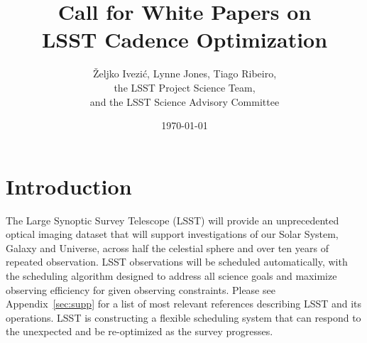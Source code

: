 \documentclass[DM,toc,usenatbib]{lsstdoc}
\title[Call for LSST Cadence White Papers]{Call for White Papers on \\ LSST Cadence Optimization}
\author{\v{Z}eljko Ivezi\'{c}, Lynne Jones, Tiago Ribeiro, \\
                 the LSST Project Science Team, \\
                 and  the LSST Science Advisory Committee}
\date{\today}
\begin{document}
\maketitle


\section{Introduction} 

The Large Synoptic Survey Telescope (LSST) will provide an unprecedented optical 
imaging dataset that will support investigations of our Solar System, Galaxy and Universe, 
across half the celestial sphere and over ten years of repeated observation. LSST observations will be
scheduled automatically, with the scheduling algorithm designed to address all science goals 
and maximize observing efficiency for given observing constraints. Please see Appendix~\ref{sec:supp}
for a list of most relevant references describing LSST and its operations. LSST is constructing a 
flexible scheduling system that can respond to the unexpected and be re-optimized as the survey progresses.
\end{document}
